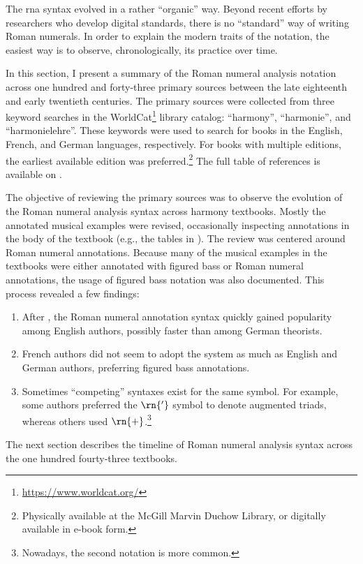 

The \gls{rna} syntax evolved in a rather ``organic'' way.
Beyond recent efforts by researchers who develop digital
standards, there is no ``standard'' way of writing Roman
numerals. In order to explain the modern traits of the
notation, the easiest way is to observe, chronologically,
its practice over time.

In this section, I present a summary of the Roman numeral
analysis notation across one hundred and forty-three primary
sources between the late eighteenth and early twentieth
centuries. The primary sources were collected from three
keyword searches in the
WorldCat\footnote{\href{https://www.worldcat.org/}{https://www.worldcat.org/}}
library catalog: ``harmony'', ``harmonie'', and
``harmonielehre''. These keywords were used to search for
books in the English, French, and German languages,
respectively. For books with multiple editions, the earliest
available edition was preferred.\footnote{Physically
available at the McGill Marvin Duchow Library, or digitally
available in e-book form.} The full table of references is
available on .



The objective of reviewing the primary sources was to
observe the evolution of the Roman numeral analysis syntax
across harmony textbooks. Mostly the annotated musical
examples were revised, occasionally inspecting annotations
in the body of the textbook (e.g., the tables in
\textcite{kirnberger1774kunst}). The review was centered
around Roman numeral annotations. Because many of the
musical examples in the textbooks were either annotated with
figured bass or Roman numeral annotations, the usage of
figured bass notation was also documented. This process
revealed a few findings:

\begin{enumerate}
    \item After \textcite{weber1817versuch}, the Roman
    numeral annotation syntax quickly gained popularity
    among English authors, possibly faster than among German
    theorists.
    \item French authors did not seem to adopt the system as
    much as English and German authors, preferring figured
    bass annotations.
    \item Sometimes ``competing'' syntaxes exist for the
    same symbol. For example, some authors preferred the
    $\rn{'}$ symbol to denote augmented triads, whereas
    others used $\rn{+}$.\footnote{Nowadays, the second
    notation is more common.}
\end{enumerate}

The next section describes the timeline of Roman numeral
analysis syntax across the one hundred fourty-three
textbooks.
